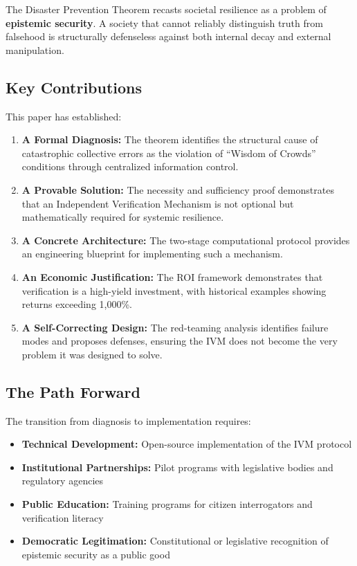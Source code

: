 \documentclass[11pt,a4paper]{article}
\begin{document}
The Disaster Prevention Theorem recasts societal resilience as a problem of \textbf{epistemic security}. A society that cannot reliably distinguish truth from falsehood is structurally defenseless against both internal decay and external manipulation.

\subsection{Key Contributions}

This paper has established:

\begin{enumerate}
    \item \textbf{A Formal Diagnosis:} The theorem identifies the structural cause of catastrophic collective errors as the violation of ``Wisdom of Crowds'' conditions through centralized information control.
    
    \item \textbf{A Provable Solution:} The necessity and sufficiency proof demonstrates that an Independent Verification Mechanism is not optional but mathematically required for systemic resilience.
    
    \item \textbf{A Concrete Architecture:} The two-stage computational protocol provides an engineering blueprint for implementing such a mechanism.
    
    \item \textbf{An Economic Justification:} The ROI framework demonstrates that verification is a high-yield investment, with historical examples showing returns exceeding 1,000\%.
    
    \item \textbf{A Self-Correcting Design:} The red-teaming analysis identifies failure modes and proposes defenses, ensuring the IVM does not become the very problem it was designed to solve.
\end{enumerate}

\subsection{The Path Forward}

The transition from diagnosis to implementation requires:

\begin{itemize}
    \item \textbf{Technical Development:} Open-source implementation of the IVM protocol
    \item \textbf{Institutional Partnerships:} Pilot programs with legislative bodies and regulatory agencies
    \item \textbf{Public Education:} Training programs for citizen interrogators and verification literacy
    \item \textbf{Democratic Legitimation:} Constitutional or legislative recognition of epistemic security as a public good
\end{itemize}
\end{document}
